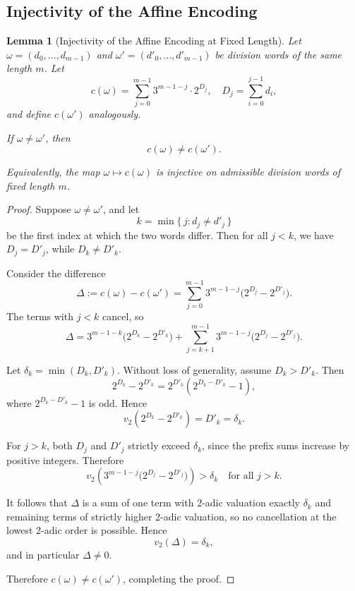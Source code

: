 \documentclass[12pt, oneside]{article}
\numberwithin{equation}{section}
\theoremstyle{definition}
\theoremstyle{plain}
\newtheorem{lemma}[theorem]{Lemma}
\theoremstyle{remark}
\begin{document}
\subsection{Injectivity of the Affine Encoding}
\begin{lemma}[Injectivity of the Affine Encoding at Fixed Length]
\label{lem:injectivity}
Let $\omega = (d_0,\dots,d_{m-1})$ and $\omega' = (d'_0,\dots,d'_{m-1})$
be division words of the same length $m$. Let
\[
c(\omega)
=
\sum_{j=0}^{m-1}
3^{m-1-j}\cdot 2^{D_j},
\quad
D_j = \sum_{i=0}^{j-1} d_i,
\]
and define $c(\omega')$ analogously.

If $\omega \ne \omega'$, then
\[
c(\omega) \ne c(\omega').
\]

Equivalently, the map $\omega \mapsto c(\omega)$ is injective on admissible
division words of fixed length $m$.
\end{lemma}

\begin{proof}
Suppose $\omega \ne \omega'$, and let
\[
k = \min\{\, j : d_j \ne d'_j \,\}
\]
be the first index at which the two words differ. Then for all $j < k$,
we have $D_j = D'_j$, while $D_k \ne D'_k$.

Consider the difference
\[
\Delta := c(\omega) - c(\omega')
=
\sum_{j=0}^{m-1}
3^{m-1-j}\bigl(2^{D_j} - 2^{D'_j}\bigr).
\]
The terms with $j<k$ cancel, so
\[
\Delta
=
3^{m-1-k}\bigl(2^{D_k} - 2^{D'_k}\bigr)
+
\sum_{j=k+1}^{m-1}
3^{m-1-j}\bigl(2^{D_j} - 2^{D'_j}\bigr).
\]

Let $\delta_k = \min(D_k, D'_k)$. Without loss of generality,
assume $D_k > D'_k$. Then
\[
2^{D_k} - 2^{D'_k}
=
2^{D'_k}(2^{D_k - D'_k} - 1),
\]
where $2^{D_k - D'_k} - 1$ is odd. Hence
\[
v_2(2^{D_k} - 2^{D'_k}) = D'_k = \delta_k.
\]

For $j>k$, both $D_j$ and $D'_j$ strictly exceed $\delta_k$, since the
prefix sums increase by positive integers. Therefore
\[
v_2\!\left(3^{m-1-j}\bigl(2^{D_j} - 2^{D'_j}\bigr)\right)
>
\delta_k
\quad \text{for all } j>k.
\]

It follows that $\Delta$ is a sum of one term with 2-adic valuation
exactly $\delta_k$ and remaining terms of strictly higher 2-adic valuation,
so no cancellation at the lowest 2-adic order is possible. Hence
\[
v_2(\Delta) = \delta_k,
\]
and in particular $\Delta \ne 0$.

Therefore $c(\omega) \ne c(\omega')$, completing the proof.
\end{proof}
\end{document}
